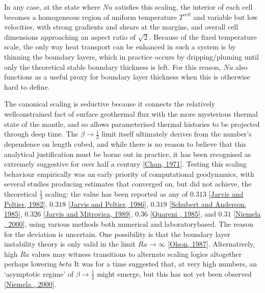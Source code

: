 \documentclass[letterpaper,10pt,english]{jupyterBook}
\begin{document}
\sphinxAtStartPar
In any case, at the state where \(Nu\) satisfies this scaling, the interior of each cell becomes a homogeneous region of uniform temperature \(T^{cell}\) and variable but low velocities, with strong gradients and shears at the margins, and overall cell dimensions approaching an aspect ratio of \(\sqrt{2}\). Because of the fixed temperature scale, the only way heat transport can be enhanced in such a system is by thinning the boundary layers, which in practice occurs by dripping/pluming until only the theoretical stable boundary thickness is left. For this reason, \(Nu\) also functions as a useful proxy for boundary layer thickness when this is otherwise hard to define.

\sphinxAtStartPar
The canonical  scaling is seductive because it connects the relatively well\sphinxhyphen{}constrained fact of surface geothermal flux with the more mysterious thermal state of the mantle, and so allows parameterised thermal histories to be projected through deep time. The \(\beta \to \frac{1}{3}\) limit itself ultimately derives from the  number’s dependence on length cubed, and while there is no  reason to believe that this analytical justification must be borne out in practice, it has been recognised as extremely suggestive for over half a century {[}\hyperlink{cite.references:id895}{Chan, 1971}{]}. Testing this scaling behaviour empirically was an early priority of computational geodynamics, with several studies producing estimates that converged on, but did not achieve, the theoretical \(\frac{1}{3}\) scaling: the value has been reported as any of \(0.313\) {[}\hyperlink{cite.references:id882}{Jarvis and Peltier, 1982}{]}, \(0.318\) {[}\hyperlink{cite.references:id755}{Jarvis and Peltier, 1986}{]}, \(0.319\) {[}\hyperlink{cite.references:id881}{Schubert and Anderson, 1985}{]}, \(0.326\) {[}\hyperlink{cite.references:id913}{Jarvis and Mitrovica, 1989}{]}, \(0.36\) {[}\hyperlink{cite.references:id879}{Quareni , 1985}{]}, and \(0.31\) {[}\hyperlink{cite.references:id190}{Niemela , 2000}{]}, using various methods both numerical and laboratory\sphinxhyphen{}based. The reason for the deviation is uncertain. One possibility is that the boundary layer instability theory is only valid in the limit \(Ra\to\infty\) {[}\hyperlink{cite.references:id761}{Olson, 1987}{]}. Alternatively, high \(Ra\) values may witness transitions to alternate scaling logics altogether \sphinxhyphen{} perhaps lowering \(beta\)  It was for a time suggested that, at very high  numbers, an ‘asymptotic regime’ of \(\beta \to \frac{1}{2}\) might emerge, but this has not yet been observed {[}\hyperlink{cite.references:id190}{Niemela , 2000}{]}.
\end{document}

